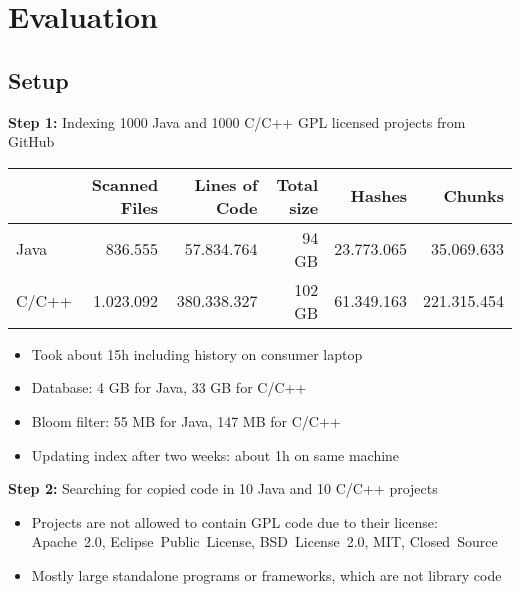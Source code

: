 
\section{Evaluation}
\subsection{Setup}
\begin{frame}{\insertsubsection}
	\textbf{Step 1:}
	Indexing 1000 Java and 1000 C/C++ GPL licensed projects from GitHub
	\begin{table}[ht]
		\centering
		\scriptsize
		\begin{tabular}{l|rrrrr}
			& \textbf{Scanned Files} & \textbf{Lines of Code} & \textbf{Total size} & \textbf{Hashes} & \textbf{Chunks} \\ 
			\hline 
			Java & 836.555 & 57.834.764 & 94 GB & 23.773.065 & 35.069.633 \\
			C/C++ & 1.023.092 & 380.338.327 & 102 GB & 61.349.163 & 221.315.454 \\ 
		\end{tabular}
	\end{table}

	\begin{itemize}
		\small
		\item Took about 15h including history on consumer laptop
		\item Database: 4 GB for Java, 33 GB for C/C++
		\item Bloom filter: 55 MB for Java, 147 MB for C/C++
		\item Updating index after two weeks: about 1h on same machine
	\end{itemize}
\end{frame}


\begin{frame}{\insertsubsection}
	\textbf{Step 2:}
	Searching for copied code in 10 Java and 10 C/C++ projects
	
	\begin{itemize}
		\small
		\item Projects are not allowed to contain GPL code due to their license: Apache~2.0, Eclipse~Public~License, BSD~License~2.0, MIT, Closed~Source
		\item Mostly large standalone programs or frameworks, which are not library code
	\end{itemize}
\end{frame}